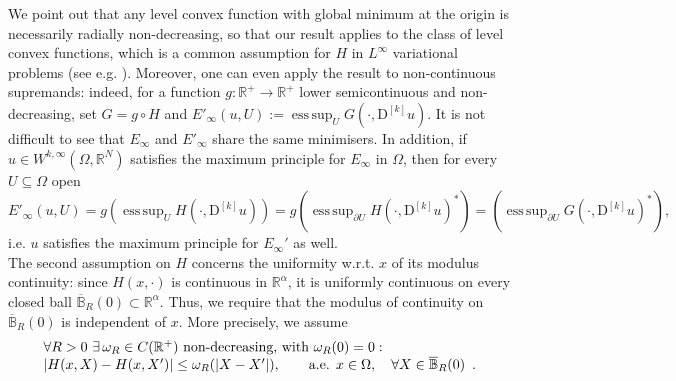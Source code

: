 \documentclass[a4paper,11pt]{article}
\numberwithin{equation}{section}
\newcommand{\numberset}{\mathbb}
\newcommand{\Om}{\Omega}
\newcommand{\R}{\numberset{R}}
\DeclareMathOperator*{\esssup}{ess\,sup}
\theoremstyle{definition}
\begin{document}
We point out that any level convex function with global minimum at the origin is necessarily radially non-decreasing, so that our result applies to the class of level convex functions, which is a common assumption for $H$ in $L^\infty$ variational problems (see e.g. \cite{BJW}).
 Moreover, one can even apply the result to non-continuous supremands: indeed, for a function $g:\R^+\to\R^+$ lower semicontinuous and non-decreasing, set $G=g\circ H$ and $E'_\infty(u,U):=\esssup_U G(\cdot,\mathrm D^{[k]} u)$. It is not difficult to see that $E_\infty$ and $E'_\infty$ share the same minimisers. In addition, if $u\in W^{k,\infty}(\Om,\R^N)$ satisfies the maximum principle for $E_\infty$ in $\Om$, then for every $U\subseteq\Om$ open
$$
E'_\infty(u,U)=g\left(\esssup_U H(\cdot, \mathrm D^{[k]}u)\right)=g\left(\esssup_{\partial U}H(\cdot, \mathrm D^{[k]}u)^*\right)=\left(\esssup_{\partial U}G(\cdot, \mathrm D^{[k]}u)^*\right),
$$ 
i.e. $u$ satisfies the maximum principle for $E_\infty'$ as well.\\
The second assumption on $H$ concerns the uniformity w.r.t. $x$ of its modulus continuity: since $H(x,\cdot)$ is continuous in $\R^\alpha$, it is uniformly continuous on every closed ball $\overline{\mathbb B}_R(0)\subset\R^\alpha$. Thus, we require that the modulus of continuity on $\overline{\mathbb B}_R(0)$ is independent of $x$. More precisely, we assume
\begin{equation}\label{uniformity}
\begin{array}{l}
\forall R>0 \,\,\exists\, \omega_R\in C(\mathbb{R}^+)\ \text{non-decreasing, with } \omega_R(0)=0: \\
\multicolumn{1}{c}{|H(x,X)-H(x,X')|\leq\omega_R(|X-X'|),\qquad \text{a.e. } x\in\Omega,\quad\forall X\in \overline{\mathbb B}_R(0)}.
\end{array}
\end{equation}
\end{document}
